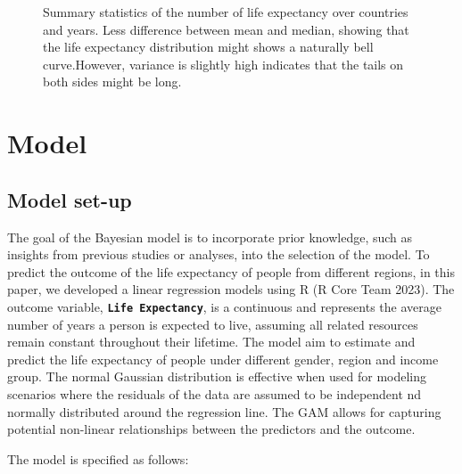 \documentclass[
  letterpaper,
  DIV=11,
  numbers=noendperiod]{scrartcl}
\begin{document}
\begin{figure}


\caption{\label{fig-summary}Summary statistics of the number of life
expectancy over countries and years. Less difference between mean and
median, showing that the life expectancy distribution might shows a
naturally bell curve.However, variance is slightly high indicates that
the tails on both sides might be long.}

\end{figure}%

\section{Model}\label{model}

\subsection{Model set-up}\label{sec-modset}

The goal of the Bayesian model is to incorporate prior knowledge, such
as insights from previous studies or analyses, into the selection of the
model. To predict the outcome of the life expectancy of people from
different regions, in this paper, we developed a linear regression
models using R (R Core Team 2023). The outcome variable,
\textbf{\texttt{Life\ Expectancy}}, is a continuous and represents the
average number of years a person is expected to live, assuming all
related resources remain constant throughout their lifetime. The model
aim to estimate and predict the life expectancy of people under
different gender, region and income group. The normal Gaussian
distribution is effective when used for modeling scenarios where the
residuals of the data are assumed to be independent nd normally
distributed around the regression line. The GAM allows for capturing
potential non-linear relationships between the predictors and the
outcome.

The model is specified as follows:
\end{document}
